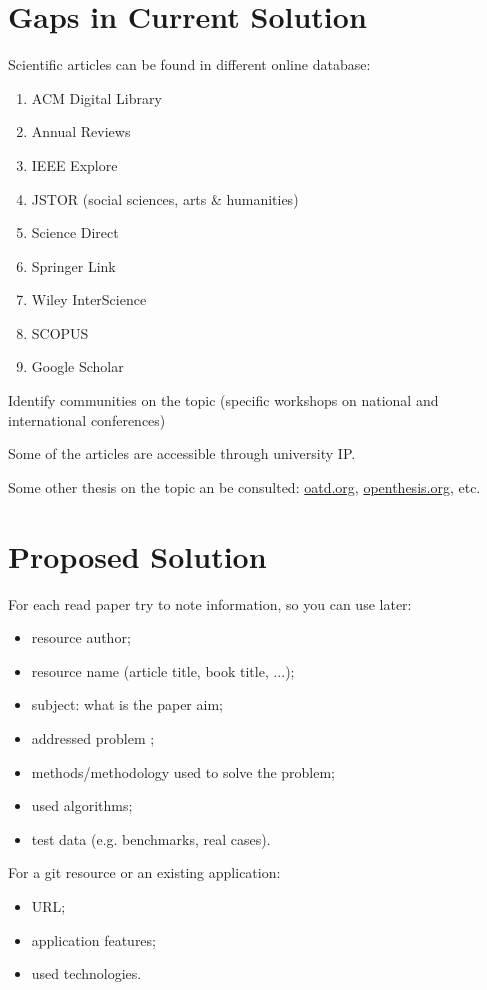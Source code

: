 \section{Gaps in Current Solution}

Scientific articles can be found in different online database:
\begin{enumerate}
    \item ACM Digital Library
    \item Annual Reviews
    \item IEEE Explore
    \item JSTOR (social sciences, arts \& humanities)
    \item Science Direct
    \item Springer Link
    \item Wiley InterScience
    \item SCOPUS
    \item  Google Scholar
\end{enumerate}

Identify communities on the topic (specific workshops on national and international conferences)

Some of the articles are accessible through university IP.

Some other thesis on the topic an be consulted: \url{oatd.org}, \url{openthesis.org}, etc.

\section{Proposed Solution}

For each read paper try to note information, so you can use later:
\begin{itemize}
    \item resource author;
    \item resource name (article title, book title, ...);
    \item subject: what is the paper aim;
    \item addressed problem ; 
    \item methods/methodology used to solve the problem;
    \item used algorithms;
    \item test data (e.g. benchmarks, real cases).
\end{itemize}

For a git resource or an existing application:
\begin{itemize}
    \item URL;
    \item application features;
    \item used technologies.
\end{itemize}